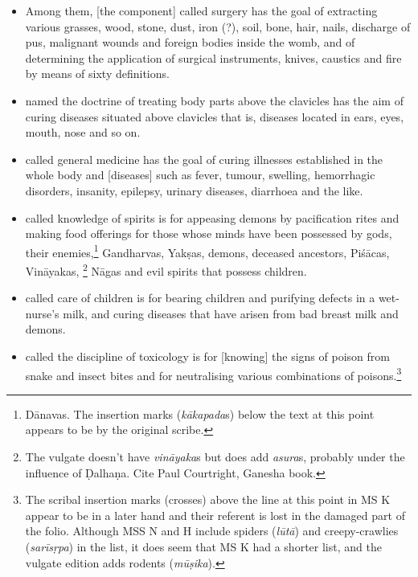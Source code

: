 \documentclass[12pt]{article}
\newcommand{\saneng}[2]{#2 (\emph{#1})}
\begin{document}
\begin{itemize}
        \item[8.1b] Among them, [the component] called surgery has the goal of extracting various grasses, wood, stone, dust, iron (?), soil, bone, hair, nails, discharge of pus, malignant wounds and foreign bodies inside the womb, and of determining the application of surgical instruments, knives, caustics and fire by means of sixty definitions.
        
        \item[8.2] [The component] named the doctrine of treating body parts above 
        the clavicles has the aim of curing diseases situated above clavicles that is,  
        diseases located in ears, eyes, mouth, nose and so on.
        
        \item[8.3] [The component] called general medicine has the goal of curing illnesses established in the whole body and [diseases] such as fever, tumour, swelling, hemorrhagic disorders, insanity, epilepsy, urinary diseases, diarrhoea and the like.
        
        \item[8.4] [The component] called knowledge of spirits is for appeasing
demons by pacification rites and making food offerings for those whose
minds have been possessed by gods, their enemies,\footnote{Dānavas.  The
insertion marks (\emph{kākapada}s) below the text at this point appears to
be by the original scribe.} Gandharvas, Yakṣas, demons, deceased
ancestors, Piśācas, Vināyakas, \footnote{The vulgate doesn't have
\emph{vināyaka}s but does add \emph{asura}s, probably under the influence
of Ḍalhaṇa.  Cite Paul Courtright, Ganesha book.} Nāgas and evil spirits
that possess children. %
          
        
        \item[8.5] [The component] called care of children is for bearing children and purifying defects in a wet-nurse's milk, and curing diseases that have arisen from bad breast milk and demons.
        
        \item[8.6] [The component] called the discipline of toxicology is for
[knowing] the signs of poison from snake and insect bites and for
neutralising various combinations of poisons.\footnote{The scribal
insertion marks (crosses) above the line at this point in MS K appear to
be in a later hand and their referent is lost in the damaged part of the
folio.  Although MSS N and H include \saneng{lūtā}{spiders} and
\saneng{sarīsṛpa}{creepy-crawlies} in the list, it does seem that MS K had
a shorter list, and the vulgate edition adds \saneng{mūṣika}{rodents}.}
        

\end{itemize}
\end{document}
